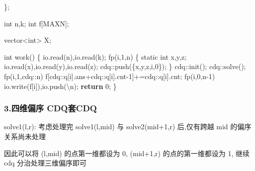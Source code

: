 \documentclass[
]{article}
\newenvironment{Shaded}{}{}
\newcommand{\AttributeTok}[1]{\textcolor[rgb]{0.49,0.56,0.16}{#1}}
\newcommand{\CharTok}[1]{\textcolor[rgb]{0.25,0.44,0.63}{#1}}
\newcommand{\ControlFlowTok}[1]{\textcolor[rgb]{0.00,0.44,0.13}{\textbf{#1}}}
\newcommand{\DataTypeTok}[1]{\textcolor[rgb]{0.56,0.13,0.00}{#1}}
\newcommand{\DecValTok}[1]{\textcolor[rgb]{0.25,0.63,0.44}{#1}}
\newcommand{\NormalTok}[1]{#1}
\newcommand{\SpecialCharTok}[1]{\textcolor[rgb]{0.25,0.44,0.63}{#1}}
\begin{document}
\begin{Shaded}
\begin{Highlighting}[]
\NormalTok{\};}

\DataTypeTok{int}\NormalTok{ n,k;}
\DataTypeTok{int}\NormalTok{ f[MAXN];}

\NormalTok{vector\textless{}}\DataTypeTok{int}\NormalTok{\textgreater{} X;}

\DataTypeTok{int}\NormalTok{ work()}
\NormalTok{\{}
\NormalTok{    io.read(n),io.read(k);}
\NormalTok{    fp(i,}\DecValTok{1}\NormalTok{,n)}
\NormalTok{    \{}
        \AttributeTok{static} \DataTypeTok{int}\NormalTok{ x,y,z;}
\NormalTok{        io.read(x),io.read(y),io.read(z);}
\NormalTok{        cdq::push(\{x,y,z,i,}\DecValTok{0}\NormalTok{\});}
\NormalTok{    \}}
\NormalTok{    cdq::init();}
\NormalTok{    cdq::solve();}
\NormalTok{    fp(i,}\DecValTok{1}\NormalTok{,cdq::n) f[cdq::q[i].ans+cdq::q[i].cnt{-}}\DecValTok{1}\NormalTok{]+=cdq::q[i].cnt;}
\NormalTok{    fp(i,}\DecValTok{0}\NormalTok{,n{-}}\DecValTok{1}\NormalTok{) io.write(f[i]),io.push(}\CharTok{\textquotesingle{}}\SpecialCharTok{\textbackslash{}n}\CharTok{\textquotesingle{}}\NormalTok{);}
    \ControlFlowTok{return} \DecValTok{0}\NormalTok{;}
\NormalTok{\}}
\end{Highlighting}
\end{Shaded}

\hypertarget{ux56dbux7ef4ux504fux5e8f-cdqux5957cdq}{%
\subsubsection{3.四维偏序
CDQ套CDQ}\label{ux56dbux7ef4ux504fux5e8f-cdqux5957cdq}}

solve1(l,r): 考虑处理完 solve1(l,mid) 与 solve2(mid+1,r) 后,仅有跨越 mid
的偏序关系尚未处理

因此可以将 (l,mid) 的点第一维都设为 0, (mid+1,r) 的点的第一维都设为 1,
继续 cdq 分治处理三维偏序即可
\end{document}
